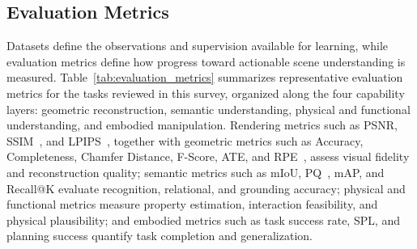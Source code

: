 \documentclass{SCIS2026}
\begin{document}
\subsection{Evaluation Metrics}
\label{subsec:evaluation_metrics}
Datasets define the observations and supervision available for learning, while evaluation metrics define how progress toward actionable scene understanding is measured. Table~\ref{tab:evaluation_metrics} summarizes representative evaluation metrics for the tasks reviewed in this survey, organized along the four capability layers: geometric reconstruction, semantic understanding, physical and functional understanding, and embodied manipulation. Rendering metrics such as PSNR, SSIM~\cite{wang2004image}, and LPIPS~\cite{zhang2018perceptual}, together with geometric metrics such as Accuracy, Completeness, Chamfer Distance, F-Score, ATE, and RPE~\cite{sturm2012benchmark}, assess visual fidelity and reconstruction quality; semantic metrics such as mIoU, PQ~\cite{kirillov2019panoptic}, mAP, and Recall@K evaluate recognition, relational, and grounding accuracy; physical and functional metrics measure property estimation, interaction feasibility, and physical plausibility; and embodied metrics such as task success rate, SPL, and planning success quantify task completion and generalization.
\end{document}
